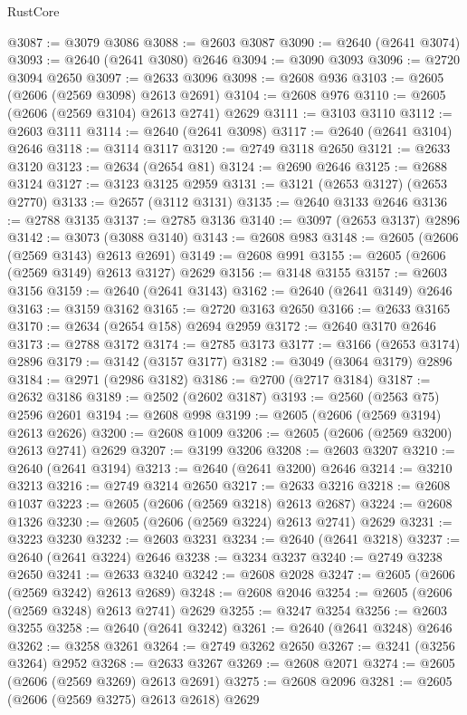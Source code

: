 \begin{lexlean}{RustCore}
\begin{coremodule}
@3087 := @3079 @3086
@3088 := @2603 @3087
@3090 := @2640 (@2641 @3074)
@3093 := @2640 (@2641 @3080) @2646
@3094 := @3090 @3093
@3096 := @2720 @3094 @2650
@3097 := @2633 @3096
@3098 := @2608 @936
@3103 := @2605 (@2606 (@2569 @3098) @2613 @2691)
@3104 := @2608 @976
@3110 := @2605 (@2606 (@2569 @3104) @2613 @2741) @2629
@3111 := @3103 @3110
@3112 := @2603 @3111
@3114 := @2640 (@2641 @3098)
@3117 := @2640 (@2641 @3104) @2646
@3118 := @3114 @3117
@3120 := @2749 @3118 @2650
@3121 := @2633 @3120
@3123 := @2634 (@2654 @81)
@3124 := @2690 @2646
@3125 := @2688 @3124
@3127 := @3123 @3125 @2959
@3131 := @3121 (@2653 @3127) (@2653 @2770)
@3133 := @2657 (@3112 @3131)
@3135 := @2640 @3133 @2646
@3136 := @2788 @3135
@3137 := @2785 @3136
@3140 := @3097 (@2653 @3137) @2896
@3142 := @3073 (@3088 @3140)
@3143 := @2608 @983
@3148 := @2605 (@2606 (@2569 @3143) @2613 @2691)
@3149 := @2608 @991
@3155 := @2605 (@2606 (@2569 @3149) @2613 @3127) @2629
@3156 := @3148 @3155
@3157 := @2603 @3156
@3159 := @2640 (@2641 @3143)
@3162 := @2640 (@2641 @3149) @2646
@3163 := @3159 @3162
@3165 := @2720 @3163 @2650
@3166 := @2633 @3165
@3170 := @2634 (@2654 @158) @2694 @2959
@3172 := @2640 @3170 @2646
@3173 := @2788 @3172
@3174 := @2785 @3173
@3177 := @3166 (@2653 @3174) @2896
@3179 := @3142 (@3157 @3177)
@3182 := @3049 (@3064 @3179) @2896
@3184 := @2971 (@2986 @3182)
@3186 := @2700 (@2717 @3184)
@3187 := @2632 @3186
@3189 := @2502 (@2602 @3187)
@3193 := @2560 (@2563 @75) @2596 @2601
@3194 := @2608 @998
@3199 := @2605 (@2606 (@2569 @3194) @2613 @2626)
@3200 := @2608 @1009
@3206 := @2605 (@2606 (@2569 @3200) @2613 @2741) @2629
@3207 := @3199 @3206
@3208 := @2603 @3207
@3210 := @2640 (@2641 @3194)
@3213 := @2640 (@2641 @3200) @2646
@3214 := @3210 @3213
@3216 := @2749 @3214 @2650
@3217 := @2633 @3216
@3218 := @2608 @1037
@3223 := @2605 (@2606 (@2569 @3218) @2613 @2687)
@3224 := @2608 @1326
@3230 := @2605 (@2606 (@2569 @3224) @2613 @2741) @2629
@3231 := @3223 @3230
@3232 := @2603 @3231
@3234 := @2640 (@2641 @3218)
@3237 := @2640 (@2641 @3224) @2646
@3238 := @3234 @3237
@3240 := @2749 @3238 @2650
@3241 := @2633 @3240
@3242 := @2608 @2028
@3247 := @2605 (@2606 (@2569 @3242) @2613 @2689)
@3248 := @2608 @2046
@3254 := @2605 (@2606 (@2569 @3248) @2613 @2741) @2629
@3255 := @3247 @3254
@3256 := @2603 @3255
@3258 := @2640 (@2641 @3242)
@3261 := @2640 (@2641 @3248) @2646
@3262 := @3258 @3261
@3264 := @2749 @3262 @2650
@3267 := @3241 (@3256 @3264) @2952
@3268 := @2633 @3267
@3269 := @2608 @2071
@3274 := @2605 (@2606 (@2569 @3269) @2613 @2691)
@3275 := @2608 @2096
@3281 := @2605 (@2606 (@2569 @3275) @2613 @2618) @2629

\end{coremodule}
\end{lexlean}
